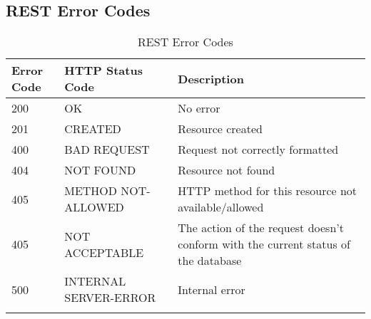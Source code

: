 \subsection{REST Error Codes}

\begin{longtable}{|p{}|p{} |p{}|} 
\hline
\textbf{Error Code} & \textbf{HTTP Status Code} & \textbf{Description} \\\hline
200 & OK &  No error \\\hline
201 & CREATED & Resource created \\\hline
400 & BAD REQUEST & Request not correctly formatted\\\hline
404 & NOT FOUND & Resource not found \\\hline
405 & METHOD NOT-ALLOWED & HTTP method for this resource not available/allowed \\\hline
405 & NOT ACCEPTABLE & The action of the request doesn't conform with the current status of the database\\\hline
500 & INTERNAL SERVER-ERROR & Internal error \\\hline
\caption{REST Error Codes}
\label{tab:termGlossary}
\end{longtable}